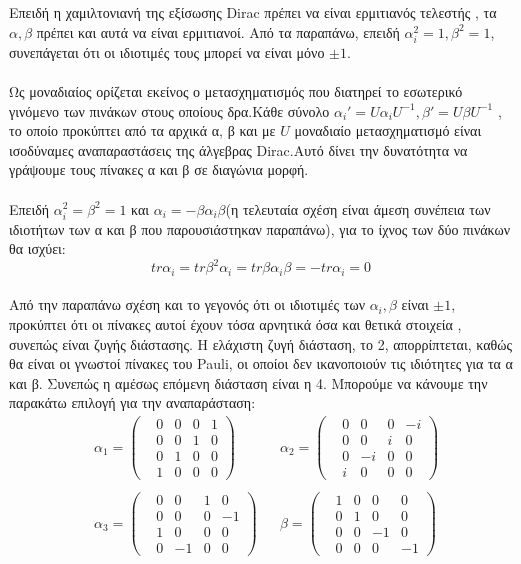 Επειδή η χαμιλτονιανή της εξίσωσης \textlatin{Dirac} πρέπει να είναι ερμιτιανός τελεστής , τα $\alpha, \beta$ πρέπει και αυτά να είναι ερμιτιανοί. Από τα παραπάνω, επειδή $\alpha_i ^2=1 , \beta ^2 = 1 $, συνεπάγεται ότι οι ιδιοτιμές τους μπορεί να είναι μόνο $\pm 1$.\\ \\
Ως μοναδιαίος ορίζεται εκείνος ο μετασχηματισμός που διατηρεί το εσωτερικό γινόμενο των πινάκων στους οποίους δρα.Κάθε σύνολο $\alpha_i' =U \alpha _i U^{-1}, \beta' =U \beta U^{-1}$ ,  το οποίο προκύπτει από τα αρχικά α, β και με $U$ μοναδιαίο μετασχηματισμό είναι ισοδύναμες αναπαραστάσεις της άλγεβρας \textlatin{Dirac}.Αυτό  δίνει την δυνατότητα να γράψουμε τους πίνακες α και β σε διαγώνια μορφή. \\ \\
Επειδή  $\alpha_i ^2= \beta^2 = 1$  και $\alpha_i= -\beta \alpha_i \beta$(η τελευταία σχέση είναι άμεση συνέπεια των ιδιοτήτων των α και β που παρουσιάστηκαν παραπάνω),   για το ίχνος των δύο πινάκων θα ισχύει:\\ 
\[ tr \alpha_i = tr \beta^2 \alpha_i =tr \beta \alpha_i \beta = -tr \alpha_i = 0 \] \\
Από την παραπάνω σχέση και το γεγονός ότι οι ιδιοτιμές των $\alpha_i, \beta$ είναι $\pm 1 $,  προκύπτει ότι οι πίνακες αυτοί έχουν τόσα αρνητικά όσα και θετικά στοιχεία , συνεπώς είναι ζυγής διάστασης. Η ελάχιστη ζυγή διάσταση, το 2, απορρίπτεται, καθώς θα είναι οι γνωστοί πίνακες του \textlatin{Pauli}, οι οποίοι δεν ικανοποιούν τις ιδιότητες για τα α και β. Συνεπώς η αμέσως επόμενη διάσταση είναι η 4. Μπορούμε να κάνουμε την παρακάτω επιλογή για την αναπαράσταση: \\
\begin{align*}
  &\alpha_1 =
  \begin{pmatrix}
     &0 &0 &0 &1\\
     &0 &0 &1 &0\\
     &0 &1 &0 &0\\
     &1 &0 &0 &0
   \end{pmatrix}
   & &\alpha_2 =
  \begin{pmatrix}
     &0 &0 &0 &-i\\
     &0 &0 &i &0\\
     &0 &-i &0 &0\\
     &i &0 &0 &0
   \end{pmatrix}\\ \\
  &\alpha_3 =
  \begin{pmatrix}
     &0 &0 &1 &0\\
     &0 &0 &0 &-1\\
     &1 &0 &0 &0\\
     &0 &-1 &0 &0
   \end{pmatrix}
   & &\beta=
  \begin{pmatrix}
     &1 &0 &0 &0\\
     &0 &1 &0 &0\\
     &0 &0 &-1 &0\\
     &0 &0 &0 &-1
   \end{pmatrix}
\end{align*}\\ 
